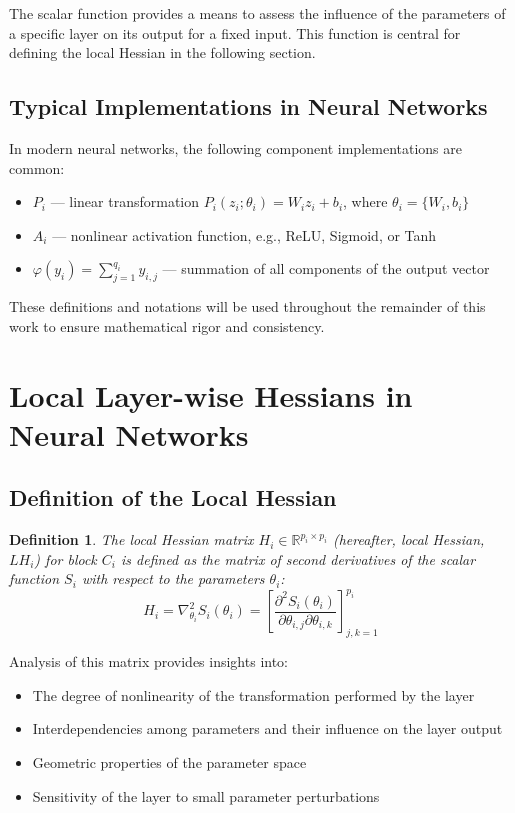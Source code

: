 \documentclass[a4paper,12pt]{article}
\newtheorem{definition}{Definition}
\begin{document}
The scalar function provides a means to assess the influence of the parameters of a specific layer on its
output for a fixed input. This function is central for defining the local Hessian in the following section.

\subsection{Typical Implementations in Neural Networks}

In modern neural networks, the following component implementations are common:
\begin{itemize}
  \item $P_i$ — linear transformation $P_i(z_i; \theta_i) = W_i z_i + b_i$, where $\theta_i = \{W_i, b_i\}$
  \item $A_i$ — nonlinear activation function, e.g., ReLU, Sigmoid, or Tanh
  \item $\varphi(y_i) = \sum_{j=1}^{q_i} y_{i,j}$ — summation of all components of the output vector
\end{itemize}

These definitions and notations will be used throughout the remainder of this work to ensure mathematical
rigor and consistency.

\section{Local Layer-wise Hessians in Neural Networks}

\subsection{Definition of the Local Hessian}

\begin{definition}
  The local Hessian matrix $H_i \in \mathbb{R}^{p_i \times p_i}$ (hereafter, local Hessian, $LH_i$) for block
  $C_i$ is defined as the matrix of second derivatives of the scalar function $S_i$ with respect to the
  parameters $\theta_i$:
  \begin{equation}
    H_i = \nabla_{\theta_i}^2 S_i(\theta_i) = \left[ \frac{\partial^2 S_i(\theta_i)}{\partial \theta_{i,j}
    \partial \theta_{i,k}} \right]_{j,k=1}^{p_i}
  \end{equation}
\end{definition}

Analysis of this matrix provides insights into:

\begin{itemize}[itemsep=0pt, topsep=0pt]
  \item The degree of nonlinearity of the transformation performed by the layer
  \item Interdependencies among parameters and their influence on the layer output
  \item Geometric properties of the parameter space
  \item Sensitivity of the layer to small parameter perturbations
\end{itemize}
\end{document}
